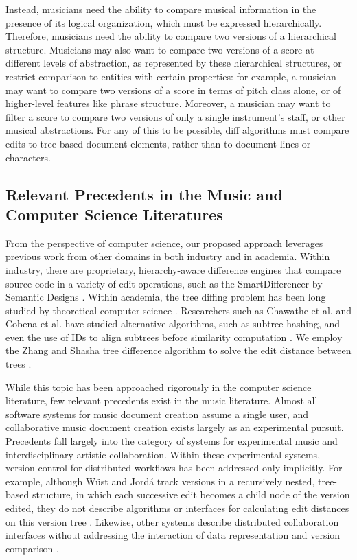 \documentclass{article}
\begin{document}
Instead, musicians need the ability to compare musical information in
the presence of its logical organization, which must be expressed
hierarchically.  Therefore, musicians need the ability to compare two
versions of a hierarchical structure. Musicians may also want to
compare two versions of a score at different levels of abstraction, as
represented by these hierarchical structures, or restrict comparison
to entities with certain properties: for example, a musician may want
to compare two versions of a score in terms of pitch class alone, or
of higher-level features like phrase structure. Moreover, a musician
may want to filter a score to compare two versions of only a single
instrument's staff, or other musical abstractions. For any of this to be possible, diff algorithms must compare edits to tree-based document elements, rather than to document lines or characters.

\subsection{Relevant Precedents in the Music and Computer Science Literatures}
From the perspective of computer science, our proposed approach leverages previous work from other domains in both
industry and in academia.  Within industry, there are proprietary,
hierarchy-aware difference engines that compare source code in a variety of 
edit operations, such as the SmartDifferencer by Semantic Designs
\cite{Designs:qm}.  Within academia, the tree diffing problem has been
long studied by theoretical computer science \cite{Bille:2005ec}.
Researchers such as Chawathe et al. and Cobena et
al. have studied alternative algorithms, such as subtree hashing, 
and even the use of IDs to align subtrees before similarity 
computation \cite{Chawathe:1996jb,Cobena:2002gd}.  We employ the Zhang 
and Shasha tree difference algorithm to solve the edit distance between
trees \cite{Zhang:1989ec,Zhang:1989il}.

While this topic has been approached rigorously in the computer science literature, few relevant precedents exist in the music literature. Almost all software systems for music document creation assume a single user, and collaborative music document creation exists largely as an experimental pursuit. Precedents fall largely into the category of systems for experimental music and interdisciplinary artistic collaboration. Within these experimental systems, version control for distributed workflows has been addressed only implicitly. For example, although W\"{u}st and Jord\'{a} track versions in a recursively nested, tree-based structure, in which each successive edit becomes a child node of the version edited, they do not describe algorithms or interfaces for calculating edit distances on this version tree \cite{wust2001architectural}. Likewise, other systems describe distributed collaboration interfaces without addressing the interaction of data representation and version comparison \cite{Balachandran:2012cr,Hepting2005}.
\end{document}
